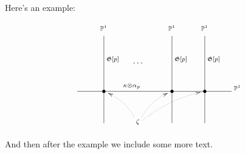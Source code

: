 \documentclass{article}
\begin{document}
Here's an example:

$$ \xymatrix{ & ^{\mathbb{P}^1}\ar@{-}[ddd]^(.3){\mathfrak{G}[p]}&  &
      ^{\mathbb{P}^1}\ar@{-}[ddd]^(.3){\mathfrak{G}[p]}&^{\mathbb{P}^1}\ar@{-}[ddd]^(.3){\mathfrak{G}[p]} & \\
   & &\dots & & & \\
   \ar@{-}[rrrrr]^(.35){\kappa\otimes\alpha_p}&\bullet & & \bullet&\bullet & ^{\mathbb{P}^1}\\
   & & ^{\zeta}\ar@/^/@{..>}[ru] \ar@/^/@{..>}[rru] \ar@/_/@{..>}[lu] & & &  \\
   } $$


And then after the example we include some more text.
\end{document}
